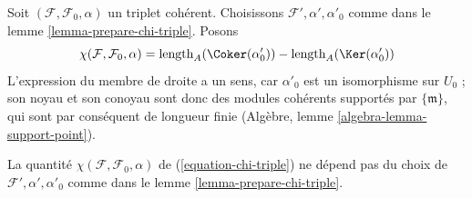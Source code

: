 \noindent
Soit $(\mathcal{F}, \mathcal{F}_0, \alpha)$ un triplet cohérent.
Choisissons $\mathcal{F}', \alpha', \alpha'_0$ comme dans le
lemme \ref{lemma-prepare-chi-triple}. Posons
\begin{equation}
\label{equation-chi-triple}
\chi(\mathcal{F}, \mathcal{F}_0, \alpha) =
\text{length}_A(\Coker(\alpha'_0)) - 
\text{length}_A(\Ker(\alpha'_0))
\end{equation}
L'expression du membre de droite a un sens, car $\alpha'_0$ est un isomorphisme
sur $U_0$ ; son noyau et son conoyau sont donc des modules cohérents supportés
par $\{\mathfrak m\}$, qui sont par conséquent de longueur finie
(Algèbre, lemme \ref{algebra-lemma-support-point}).

\begin{lemma}
\label{lemma-well-defined-chi-triple}
La quantité $\chi(\mathcal{F}, \mathcal{F}_0, \alpha)$ de
(\ref{equation-chi-triple}) ne dépend pas du choix de
$\mathcal{F}', \alpha', \alpha'_0$ comme dans le lemme \ref{lemma-prepare-chi-triple}.
\end{lemma}

